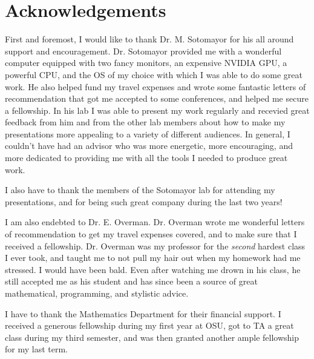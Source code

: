 \newpage
\section*{Acknowledgements}
        First and foremost, I would like to thank Dr. M. Sotomayor for his all around support and encouragement. Dr. Sotomayor provided me with a wonderful computer equipped with two fancy monitors, an expensive NVIDIA GPU, a powerful CPU, and the OS of my choice with which I was able to do some great work. He also helped fund my travel expenses and wrote some fantastic letters of recommendation that got me accepted to some conferences, and helped me secure a fellowship. In his lab I was able to present my work regularly and recevied great feedback from him and from the other lab members about how to make my presentations more appealing to a variety of different audiences. In general, I couldn't have had an advisor who was more energetic, more encouraging, and more dedicated to providing me with all the tools I  needed to produce great work.

        I also have to thank the members of the Sotomayor lab for attending my presentations, and for being such great company during the last two years!

        I am also endebted to Dr. E. Overman. Dr. Overman wrote me wonderful letters of recommendation to get my travel expenses covered, and to make sure that I received a fellowship. Dr. Overman was my professor for the \emph{second} hardest class I ever took, and taught me to not pull my hair out when my homework had me stressed. I would have been bald. Even after watching me drown in his class, he still accepted me as his student and has since been a source of great mathematical, programming, and stylistic advice.

        I have to thank the Mathematics Department for their financial support. I received a generous fellowship during my first year at OSU, got to TA a great class during my third semester, and was then granted another ample fellowship for my last term. 

        
